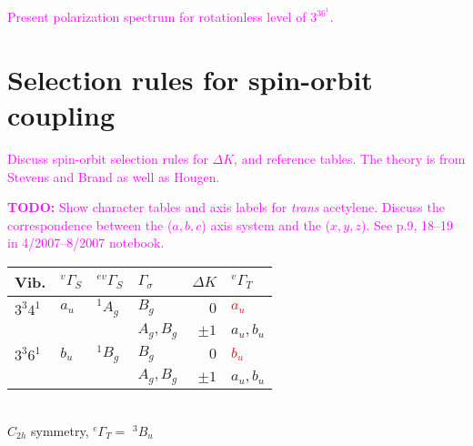 \documentclass[12pt]{mitthesis}
\newcommand{\TODO} [1]{\textcolor{magenta}{\textbf{TODO:} #1}}
\newcommand{\POINT}[1]{\textcolor{magenta}{#1}}
\begin{document}
\POINT{Present polarization spectrum for rotationless level of
  $3^36^1$.}

\section{Selection rules for spin-orbit coupling}

\POINT{Discuss spin-orbit selection rules for $\Delta K$, and
  reference tables.  The theory is from Stevens and Brand as well as
  Hougen.}

\TODO{Show character tables and axis labels for \emph{trans}
  acetylene.  Discuss the correspondence between the ($a,b,c$) axis
  system and the ($x,y,z$).  See p.9, 18--19 in 4/2007--8/2007 notebook.}

\begin{table}
  \centering
  \begin{tabular}{llllrl}
    Vib.
    & $^{v}\Gamma_S$ & $^{ev}\Gamma_S$ & $\Gamma_\sigma$ 
    & $\Delta K$ & $^{v}\Gamma_T$ \\
    \toprule




    $3^3 4^1$ 
    & $a_u$ & $^{1}A_g$ & $B_g$ & $0$ & \textcolor{red}{$a_u$} \\
    & & & $A_g, B_g$ & $\pm1$ & $a_u, b_u$ \\[10pt]

    $3^3 6^1$ 
    & $b_u$ & $^{1}B_g$ & $B_g$ & $0$ & \textcolor{red}{$b_u$} \\
    & & & $A_g, B_g$ & $\pm1$ & $a_u, b_u$ \\

  \end{tabular}\\[5mm]
  
  $C_{2h}$ symmetry, $^{e}\Gamma_T =$ $^{3}B_u$\\[1cm]


\end{table}
\end{document}
